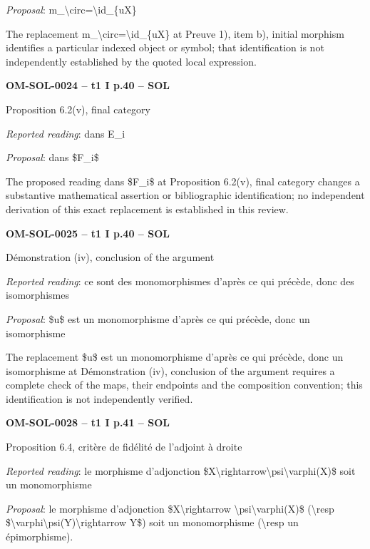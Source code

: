 \emph{Proposal}: m\_\textbackslash{}circ=\allowbreak \textbackslash{}id\_\{uX\}\par
The replacement m\_\textbackslash{}circ=\allowbreak \textbackslash{}id\_\{uX\} at Preuve 1), item b), initial morphism identifies a particular indexed object or symbol; that identification is not independently established by the quoted local expression.\par
\par\noindent\textbf{OM-SOL-0024 -- t1 I p.40 -- SOL}\par
Proposition 6.2(v), final category\par
\emph{Reported reading}: dans E\_i\par
\emph{Proposal}: dans \$F\_i\$\par
The proposed reading dans \$F\_i\$ at Proposition 6.2(v), final category changes a substantive mathematical assertion or bibliographic identification; no independent derivation of this exact replacement is established in this review.\par
\par\noindent\textbf{OM-SOL-0025 -- t1 I p.40 -- SOL}\par
Démonstration (iv), conclusion of the argument\par
\emph{Reported reading}: ce sont des monomorphismes d'après ce qui précède, donc des isomorphismes\par
\emph{Proposal}: \$u\$ est un monomorphisme d'après ce qui précède, donc un isomorphisme\par
The replacement \$u\$ est un monomorphisme d'après ce qui précède, donc un isomorphisme at Démonstration (iv), conclusion of the argument requires a complete check of the maps, their endpoints and the composition convention; this identification is not independently verified.\par
\par\noindent\textbf{OM-SOL-0028 -- t1 I p.41 -- SOL}\par
Proposition 6.4, critère de fidélité de l'adjoint à droite\par
\emph{Reported reading}: le morphisme d'adjonction \$X\textbackslash{}rightarrow\textbackslash{}psi\textbackslash{}varphi(X)\$ soit un monomorphisme\par
\emph{Proposal}: le morphisme d'adjonction \$X\textbackslash{}rightarrow \textbackslash{}psi\textbackslash{}varphi(X)\$ (\textbackslash{}resp \$\textbackslash{}varphi\textbackslash{}psi(Y)\textbackslash{}rightarrow Y\$) soit un monomorphisme (\textbackslash{}resp un épimorphisme).\par
